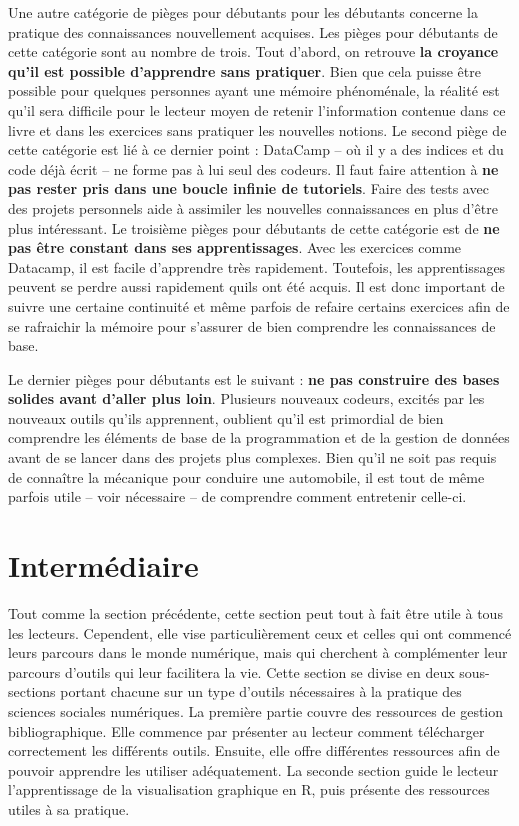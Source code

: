 \documentclass[
  letterpaper,
  DIV=11,
  numbers=noendperiod]{scrreprt}
\begin{document}
Une autre catégorie de pièges pour débutants pour les débutants concerne
la pratique des connaissances nouvellement acquises. Les pièges pour
débutants de cette catégorie sont au nombre de trois. Tout d'abord, on
retrouve \textbf{la croyance qu'il est possible d'apprendre sans
pratiquer}. Bien que cela puisse être possible pour quelques personnes
ayant une mémoire phénoménale, la réalité est qu'il sera difficile pour
le lecteur moyen de retenir l'information contenue dans ce livre et dans
les exercices sans pratiquer les nouvelles notions. Le second piège de
cette catégorie est lié à ce dernier point : DataCamp -- où il y a des
indices et du code déjà écrit -- ne forme pas à lui seul des codeurs. Il
faut faire attention à \textbf{ne pas rester pris dans une boucle
infinie de tutoriels}. Faire des tests avec des projets personnels aide
à assimiler les nouvelles connaissances en plus d'être plus intéressant.
Le troisième pièges pour débutants de cette catégorie est de \textbf{ne
pas être constant dans ses apprentissages}. Avec les exercices comme
Datacamp, il est facile d'apprendre très rapidement. Toutefois, les
apprentissages peuvent se perdre aussi rapidement qu\textquotesingle ils
ont été acquis. Il est donc important de suivre une certaine continuité
et même parfois de refaire certains exercices afin de se rafraichir la
mémoire pour s'assurer de bien comprendre les connaissances de base.

Le dernier pièges pour débutants est le suivant : \textbf{ne pas
construire des bases solides avant d'aller plus loin}. Plusieurs
nouveaux codeurs, excités par les nouveaux outils qu'ils apprennent,
oublient qu'il est primordial de bien comprendre les éléments de base de
la programmation et de la gestion de données avant de se lancer dans des
projets plus complexes. Bien qu'il ne soit pas requis de connaître la
mécanique pour conduire une automobile, il est tout de même parfois
utile -- voir nécessaire -- de comprendre comment entretenir celle-ci.

\section{Intermédiaire}\label{intermuxe9diaire}

Tout comme la section précédente, cette section peut tout à fait être
utile à tous les lecteurs. Cependent, elle vise particulièrement ceux et
celles qui ont commencé leurs parcours dans le monde numérique, mais qui
cherchent à complémenter leur parcours d'outils qui leur facilitera la
vie. Cette section se divise en deux sous-sections portant chacune sur
un type d'outils nécessaires à la pratique des sciences sociales
numériques. La première partie couvre des ressources de gestion
bibliographique. Elle commence par présenter au lecteur comment
télécharger correctement les différents outils. Ensuite, elle offre
différentes ressources afin de pouvoir apprendre les utiliser
adéquatement. La seconde section guide le lecteur l'apprentissage de la
visualisation graphique en R, puis présente des ressources utiles à sa
pratique.
\end{document}
